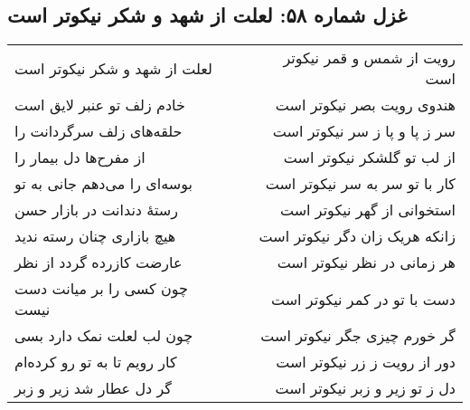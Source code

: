 \begin{center}
\section*{غزل شماره ۵۸: لعلت از شهد و شکر نیکوتر است}
\label{sec:058}
\begin{longtable}{l p{0.5cm} r}
لعلت از شهد و شکر نیکوتر است
&&
رویت از شمس و قمر نیکوتر است
\\
خادم زلف تو عنبر لایق است
&&
هندوی رویت بصر نیکوتر است
\\
حلقه‌های زلف سرگردانت را
&&
سر ز پا و پا ز سر نیکوتر است
\\
از مفرح‌ها دل بیمار را
&&
از لب تو گلشکر نیکوتر است
\\
بوسه‌ای را می‌دهم جانی به تو
&&
کار با تو سر به سر نیکوتر است
\\
رستهٔ دندانت در بازار حسن
&&
استخوانی از گهر نیکوتر است
\\
هیچ بازاری چنان رسته ندید
&&
زانکه هریک زان دگر نیکوتر است
\\
عارضت کازرده گردد از نظر
&&
هر زمانی در نظر نیکوتر است
\\
چون کسی را بر میانت دست نیست
&&
دست با تو در کمر نیکوتر است
\\
چون لب لعلت نمک دارد بسی
&&
گر خورم چیزی جگر نیکوتر است
\\
کار رویم تا به تو رو کرده‌ام
&&
دور از رویت ز زر نیکوتر است
\\
گر دل عطار شد زیر و زبر
&&
دل ز تو زیر و زبر نیکوتر است
\\
\end{longtable}
\end{center}
